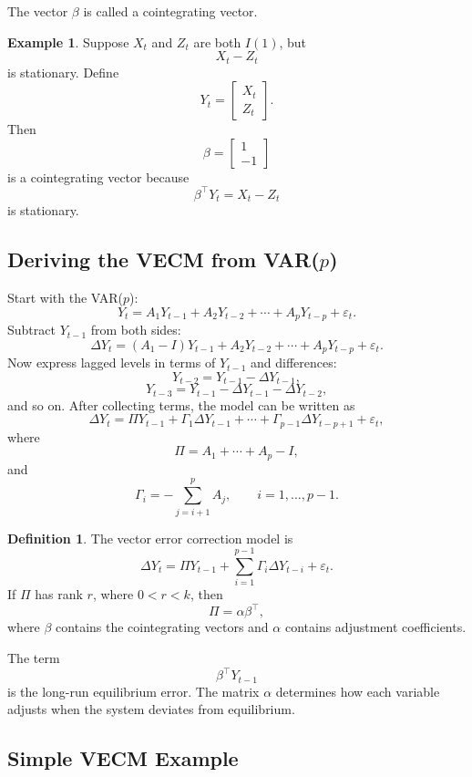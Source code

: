\documentclass[12pt,oneside]{book}
\numberwithin{equation}{section}
\theoremstyle{definition}
\newtheorem{definition}{Definition}[section]
\newtheorem{example}{Example}[section]
\theoremstyle{plain}
\theoremstyle{remark}
\begin{document}
The vector $\beta$ is called a cointegrating vector.

\begin{example}
Suppose $X_t$ and $Z_t$ are both $I(1)$, but
\[
X_t-Z_t
\]
is stationary. Define
\[
Y_t=
\begin{bmatrix}
X_t\\
Z_t
\end{bmatrix}.
\]
Then
\[
\beta=
\begin{bmatrix}
1\\
-1
\end{bmatrix}
\]
is a cointegrating vector because
\[
\beta^\top Y_t=X_t-Z_t
\]
is stationary.
\end{example}

\subsection{Deriving the VECM from VAR($p$)}

Start with the VAR($p$):
\[
Y_t
=
A_1Y_{t-1}
+
A_2Y_{t-2}
+
\cdots
+
A_pY_{t-p}
+
\varepsilon_t.
\]
Subtract $Y_{t-1}$ from both sides:
\[
\Delta Y_t
=
(A_1-I)Y_{t-1}
+
A_2Y_{t-2}
+
\cdots
+
A_pY_{t-p}
+
\varepsilon_t.
\]
Now express lagged levels in terms of $Y_{t-1}$ and differences:
\[
Y_{t-2}=Y_{t-1}-\Delta Y_{t-1},
\]
\[
Y_{t-3}=Y_{t-1}-\Delta Y_{t-1}-\Delta Y_{t-2},
\]
and so on. After collecting terms, the model can be written as
\[
\Delta Y_t
=
\Pi Y_{t-1}
+
\Gamma_1\Delta Y_{t-1}
+
\cdots
+
\Gamma_{p-1}\Delta Y_{t-p+1}
+
\varepsilon_t,
\]
where
\[
\Pi=A_1+\cdots+A_p-I,
\]
and
\[
\Gamma_i
=
-\sum_{j=i+1}^{p}A_j,
\qquad
i=1,\ldots,p-1.
\]

\begin{definition}
The vector error correction model is
\[
\Delta Y_t
=
\Pi Y_{t-1}
+
\sum_{i=1}^{p-1}\Gamma_i\Delta Y_{t-i}
+
\varepsilon_t.
\]
If $\Pi$ has rank $r$, where $0<r<k$, then
\[
\Pi=\alpha\beta^\top,
\]
where $\beta$ contains the cointegrating vectors and $\alpha$ contains adjustment coefficients.
\end{definition}

The term
\[
\beta^\top Y_{t-1}
\]
is the long-run equilibrium error. The matrix $\alpha$ determines how each variable adjusts when the system deviates from equilibrium.

\subsection{Simple VECM Example}
\end{document}
